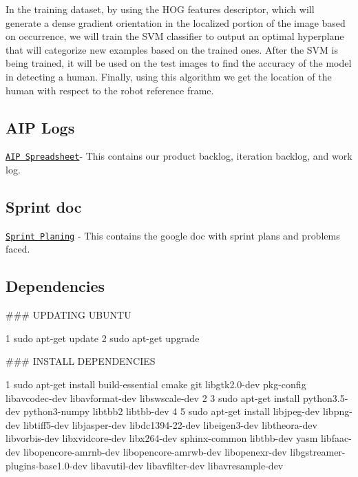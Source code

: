 In the training dataset, by using the H\+OG features descriptor, which will generate a dense gradient orientation in the localized portion of the image based on occurrence, we will train the S\+VM classifier to output an optimal hyperplane that will categorize new examples based on the trained ones. After the S\+VM is being trained, it will be used on the test images to find the accuracy of the model in detecting a human. Finally, using this algorithm we get the location of the human with respect to the robot reference frame.

\subsection*{A\+IP Logs}

\href{https://docs.google.com/spreadsheets/d/1HgRF67QFG2dfj0phShHm68qmcLSaLB29Txy_yOnODAY/edit?usp=sharing}{\tt A\+IP Spreadsheet}-\/ This contains our product backlog, iteration backlog, and work log. \subsection*{Sprint doc}

\href{https://docs.google.com/document/d/1q1fZa8T8o8WiPjqkdCYfT_voSZSvZKb0-bGTY7lCoBc/edit?usp=sharing}{\tt Sprint Planing} -\/ This contains the google doc with sprint plans and problems faced.

\subsection*{Dependencies}

\#\#\# U\+P\+D\+A\+T\+I\+NG U\+B\+U\+N\+TU 
\begin{DoxyCode}
1 sudo apt-get update
2 sudo apt-get upgrade
\end{DoxyCode}
 \#\#\# I\+N\+S\+T\+A\+LL D\+E\+P\+E\+N\+D\+E\+N\+C\+I\+ES 
\begin{DoxyCode}
1 sudo apt-get install build-essential cmake git libgtk2.0-dev pkg-config libavcodec-dev libavformat-dev
       libswscale-dev
2 
3 sudo apt-get install python3.5-dev python3-numpy libtbb2 libtbb-dev
4 
5 sudo apt-get install libjpeg-dev libpng-dev libtiff5-dev libjasper-dev libdc1394-22-dev libeigen3-dev
       libtheora-dev libvorbis-dev libxvidcore-dev libx264-dev sphinx-common libtbb-dev yasm libfaac-dev
       libopencore-amrnb-dev libopencore-amrwb-dev libopenexr-dev libgstreamer-plugins-base1.0-dev libavutil-dev libavfilter-dev
       libavresample-dev
\end{DoxyCode}
